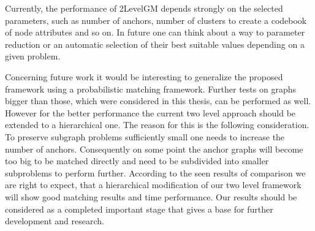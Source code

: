 Currently, the performance of 2LevelGM depends strongly on the selected parameters, such as number of anchors, number of clusters to create a codebook of node attributes and so on. In future one can think about a way to parameter reduction or an automatic selection of their best suitable values depending on a given problem.

Concerning future work it would be interesting to generalize the proposed framework using a probabilistic matching framework. Further tests on graphs bigger than those, which were considered in this thesis, can be performed as well. However for the better performance the current two level approach should be extended to a hierarchical one. The reason for this is the following consideration. To preserve subgraph problems sufficiently small one needs to increase the number of anchors. Consequently on some point the anchor graphs will become too big to be matched directly and need to be subdivided into smaller subproblems to perform further. According to the seen results of comparison we are right to expect, that a hierarchical modification of our two level framework will show good matching results and time performance. 
Our results should be considered as a completed important stage that gives a base for further development and research.

 
